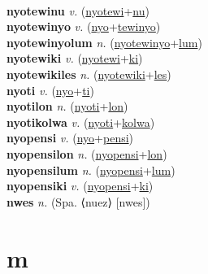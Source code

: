  \label{nyotewilum} \\
\textbf{nyotewinu} \textit{v.} (\hyperref[nyotewi]{nyotewi}+\hyperref[nu]{nu})
 \label{nyotewinu} \\
\textbf{nyotewinyo} \textit{v.} (\hyperref[nyo]{nyo}+\hyperref[tewinyo]{tewinyo})
 \label{nyotewinyo} \\
\textbf{nyotewinyolum} \textit{n.} (\hyperref[nyotewinyo]{nyotewinyo}+\hyperref[lum]{lum})
 \label{nyotewinyolum} \\
\textbf{nyotewiki} \textit{v.} (\hyperref[nyotewi]{nyotewi}+\hyperref[ki]{ki})
 \label{nyotewiki} \\
\textbf{nyotewikiles} \textit{n.} (\hyperref[nyotewiki]{nyotewiki}+\hyperref[les]{les})
 \label{nyotewikiles} \\
\textbf{nyoti} \textit{v.} (\hyperref[nyo]{nyo}+\hyperref[ti]{ti})
 \label{nyoti} \\
\textbf{nyotilon} \textit{n.} (\hyperref[nyoti]{nyoti}+\hyperref[lon]{lon})
 \label{nyotilon} \\
\textbf{nyotikolwa} \textit{v.} (\hyperref[nyoti]{nyoti}+\hyperref[kolwa]{kolwa})
 \label{nyotikolwa} \\
\textbf{nyopensi} \textit{v.} (\hyperref[nyo]{nyo}+\hyperref[pensi]{pensi})
 \label{nyopensi} \\
\textbf{nyopensilon} \textit{n.} (\hyperref[nyopensi]{nyopensi}+\hyperref[lon]{lon})
 \label{nyopensilon} \\
\textbf{nyopensilum} \textit{n.} (\hyperref[nyopensi]{nyopensi}+\hyperref[lum]{lum})
 \label{nyopensilum} \\
\textbf{nyopensiki} \textit{v.} (\hyperref[nyopensi]{nyopensi}+\hyperref[ki]{ki})
 \label{nyopensiki} \\
\textbf{nwes} \textit{n.} (Spa. ⟨nuez⟩ [nwes])
 \label{nwes} 

\section{m}

